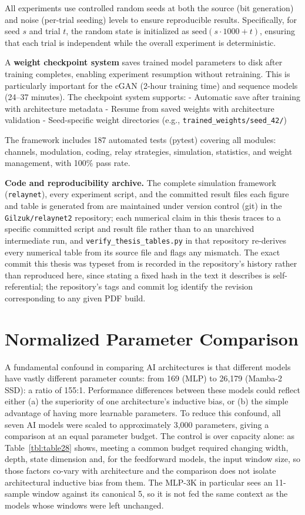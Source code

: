 All experiments use controlled random seeds at both the source (bit generation) and noise (per-trial seeding) levels to ensure reproducible results. Specifically, for seed \(s\) and trial \(t\), the random state is initialized as \(\text{seed}(s \cdot 1000 + t)\), ensuring that each trial is independent while the overall experiment is deterministic.

A \textbf{weight checkpoint system} saves trained model parameters to disk after training completes, enabling experiment resumption without retraining. This is particularly important for the cGAN (2-hour training time) and sequence models (24--37 minutes). The checkpoint system supports: - Automatic save after training with architecture metadata - Resume from saved weights with architecture validation - Seed-specific weight directories (e.g., \texttt{trained\_weights/seed\_42/})

The framework includes 187 automated tests (pytest) covering all modules: channels, modulation, coding, relay strategies, simulation, statistics, and weight management, with 100\% pass rate.

\textbf{Code and reproducibility archive.} The complete simulation framework (\texttt{relaynet}), every experiment script, and the committed result files each figure and table is generated from are maintained under version control (git) in the \texttt{Gilzuk/relaynet2} repository; each numerical claim in this thesis traces to a specific committed script and result file rather than to an unarchived intermediate run, and \texttt{verify\_thesis\_tables.py} in that repository re-derives every numerical table from its source file and flags any mismatch. The exact commit this thesis was typeset from is recorded in the repository's history rather than reproduced here, since stating a fixed hash in the text it describes is self-referential; the repository's tags and commit log identify the revision corresponding to any given PDF build.

\section{Normalized Parameter Comparison}\label{sec:normalized-parameter-comparison}

A fundamental confound in comparing AI architectures is that different models have vastly different parameter counts: from 169 (MLP) to 26,179 (Mamba-2 SSD): a ratio of 155:1. Performance differences between these models could reflect either (a) the superiority of one architecture's inductive bias, or (b) the simple advantage of having more learnable parameters. To reduce this confound, all seven AI models were scaled to approximately 3,000 parameters, giving a comparison at an equal parameter budget. The control is over capacity alone: as Table~\ref{tbl:table28} shows, meeting a common budget required changing width, depth, state dimension and, for the feedforward models, the input window size, so those factors co-vary with architecture and the comparison does not isolate architectural inductive bias from them. The MLP-3K in particular sees an 11-sample window against its canonical 5, so it is not fed the same context as the models whose windows were left unchanged.

